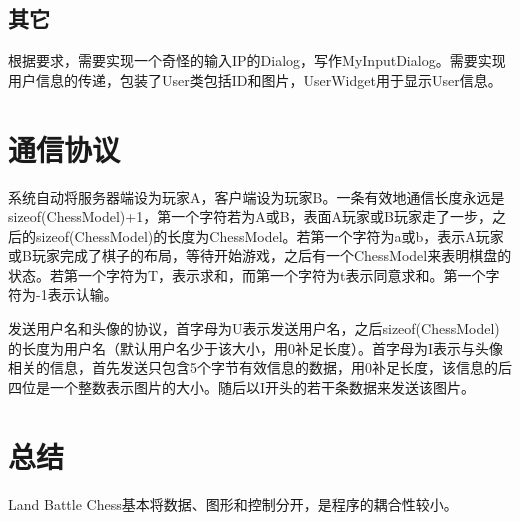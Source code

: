 \documentclass[12pt]{article}
\begin{document}
\subsection{其它}
根据要求，需要实现一个奇怪的输入IP的Dialog，写作MyInputDialog。需要实现用户信息的传递，包装了User类包括ID和图片，UserWidget用于显示User信息。
\section{通信协议}
系统自动将服务器端设为玩家A，客户端设为玩家B。一条有效地通信长度永远是sizeof(ChessModel)+1，第一个字符若为A或B，表面A玩家或B玩家走了一步，之后的sizeof(ChessModel)的长度为ChessModel。若第一个字符为a或b，表示A玩家或B玩家完成了棋子的布局，等待开始游戏，之后有一个ChessModel来表明棋盘的状态。若第一个字符为T，表示求和，而第一个字符为t表示同意求和。第一个字符为-1表示认输。

发送用户名和头像的协议，首字母为U表示发送用户名，之后sizeof(ChessModel)的长度为用户名（默认用户名少于该大小，用0补足长度）。首字母为I表示与头像相关的信息，首先发送只包含5个字节有效信息的数据，用0补足长度，该信息的后四位是一个整数表示图片的大小。随后以I开头的若干条数据来发送该图片。
\section{总结}
Land Battle Chess基本将数据、图形和控制分开，是程序的耦合性较小。
\end{document}
